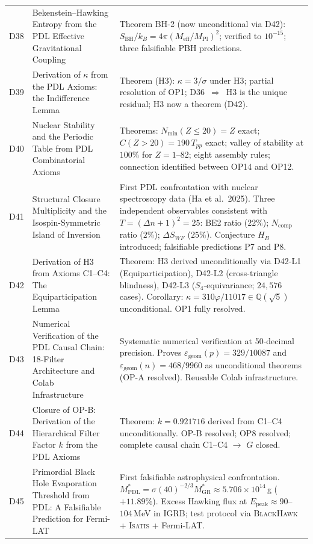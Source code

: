 \documentclass[11pt,a4paper]{article}
\theoremstyle{plain}
\theoremstyle{definition}
\theoremstyle{remark}
\newcommand{\SBH}{S_{\mathrm{BH}}}
\newcommand{\Meff}{M_{\mathrm{eff}}}
\newcommand{\MPl}{M_{\mathrm{Pl}}}
\newcommand{\Tpp}{T_{pp}}
\begin{document}
\begin{longtable}{L{1.3cm}L{3.8cm}L{8.0cm}}
D38 & Bekenstein--Hawking Entropy from the PDL Effective Gravitational Coupling~\cite{D38} & \textcolor{proofblue}{Theorem BH-2} (now unconditional via D42): $\SBH/k_B=4\pi(\Meff/\MPl)^2$; verified to $10^{-15}$; three falsifiable PBH predictions.\\[0.3em]
D39 & Derivation of $\kappa$ from the PDL Axioms: the Indifference Lemma~\cite{D39} & \textcolor{proofblue}{Theorem (H3)}: $\kappa=3/\sigma$ under H3; partial resolution of OP1; D36~$\Rightarrow$~H3 is the unique residual; H3 now a theorem (D42).\\[0.4em]
D40 & Nuclear Stability and the Periodic Table from PDL Combinatorial Axioms~\cite{D40} & \textcolor{proofblue}{Theorems}: $N_{\min}(Z\leq20)=Z$ exact; $C(Z>20)=190\,\Tpp$ exact; valley of stability at $100\%$ for $Z=1$--82; eight assembly rules; connection identified between OP14 and OP12.\\[0.4em]
D41 & Structural Closure Multiplicity and the Isospin-Symmetric Island of Inversion~\cite{D41} & First PDL confrontation with nuclear spectroscopy data (Ha et al.~2025). Three independent observables consistent with $T=(\Delta n+1)^2=25$: BE2 ratio ($22\%$); $N_{\mathrm{comp}}$ ratio ($2\%$); $\Delta S_{WF}$ ($25\%$). Conjecture $H_B$ introduced; falsifiable predictions P7 and P8.\\[0.4em]
D42 & Derivation of H3 from Axioms C1--C4: The Equiparticipation Lemma~\cite{D42} & \textcolor{proofblue}{Theorem}: H3 derived unconditionally via D42-L1 (Equiparticipation), D42-L2 (cross-triangle blindness), D42-L3 ($S_4$-equivariance; $24{,}576$ cases). Corollary: $\kappa=310\varphi/11017\in\mathbb{Q}(\sqrt{5})$ unconditional. OP1 fully resolved.\\[0.4em]
D43 & Numerical Verification of the PDL Causal Chain: 18-Filter Architecture and Colab Infrastructure~\cite{D43} & Systematic numerical verification at 50-decimal precision. Proves $\varepsilon_{\mathrm{geom}}(p) = 329/10087$ and $\varepsilon_{\mathrm{geom}}(n) = 468/9960$ as unconditional theorems (OP-A resolved). Reusable Colab infrastructure.\\[0.4em]
D44 & Closure of OP-B: Derivation of the Hierarchical Filter Factor $k$ from the PDL Axioms~\cite{D44} & \textcolor{proofblue}{Theorem}: $k = 0.921716$ derived from C1--C4 unconditionally. OP-B resolved; OP8 resolved; complete causal chain C1--C4 $\to$ $G$ closed.\\[0.4em]
D45 & Primordial Black Hole Evaporation Threshold from PDL: A Falsifiable Prediction for Fermi-LAT~\cite{D45} & First falsifiable astrophysical confrontation. $M^*_{\mathrm{PDL}} = \sigma(40)^{-2/3} M^*_{\mathrm{GR}} \approx 5.706 \times 10^{14}$\,g ($+11.89\%$). Excess Hawking flux at $E_{\mathrm{peak}} \approx 90$--$104$\,MeV in IGRB; test protocol via \textsc{BlackHawk} + \textsc{Isatis} + Fermi-LAT.\\[0.4em]

\end{longtable}
\end{document}

